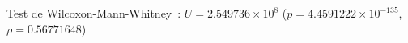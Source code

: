 Test de Wilcoxon-Mann-Whitney : $U = 2.549736 \times 10^{8}$ ($p = 4.4591222 \times 10^{-135}$, $ρ = 0.56771648$)